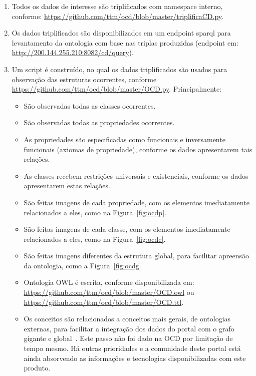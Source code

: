 \documentclass[12pt]{article}
\begin{document}
\begin{enumerate}
    \item Todos os dados de interesse são triplificados com namespace interno, conforme: \url{https://github.com/ttm/ocd/blob/master/triplificaCD.py}.
    \item Os dados triplificados são disponibilizados em um endpoint sparql para levantamento da ontologia com base nas triplas produzidas (endpoint em: \url{http://200.144.255.210:8082/cd/query}).
    \item Um script é construído, no qual os dados triplificados são usados para observação das estruturas ocorrentes, conforme \url{https://github.com/ttm/ocd/blob/master/OCD.py}. Principalmente:
\begin{itemize}
        \item São observadas todas as classes ocorrentes.
        \item São observadas todas as propriedades ocorrentes.
        \item As propriedades são especificadas como funcionais e inversamente funcionais (axiomas de propriedade), conforme os dados apresentarem tais relações.
        \item As classes recebem restrições universais e existenciais, conforme os dados apresentarem estas relações.
        \item São feitas imagens de cada propriedade, com os elementos imediatamente relacionados a eles, como na Figura~\ref{fig:ocdp}.
        \item São feitas imagens de cada classe, com os elementos imediatamente relacionados a eles, como na Figura~\ref{fig:ocdc}.
        \item São feitas imagens diferentes da estrutura global, para facilitar apreensão da ontologia, como a Figura~\ref{fig:ocdg}.
        \item Ontologia OWL é escrita, conforme disponibilizada em: \url{https://github.com/ttm/ocd/blob/master/OCD.owl} ou \url{https://github.com/ttm/ocd/blob/master/OCD.ttl}.
        \item Os conceitos são relacionados a conceitos mais gerais, de ontologias externas, para facilitar a integração dos dados do portal com o grafo gigante e global~\cite{LOD}. Este passo não foi dado na OCD por limitação de tempo mesmo. Há outras prioridades e a comunidade deste portal está ainda absorvendo as informações e tecnologias disponibilizadas com este produto.
\end{itemize}
\end{enumerate}
\end{document}
